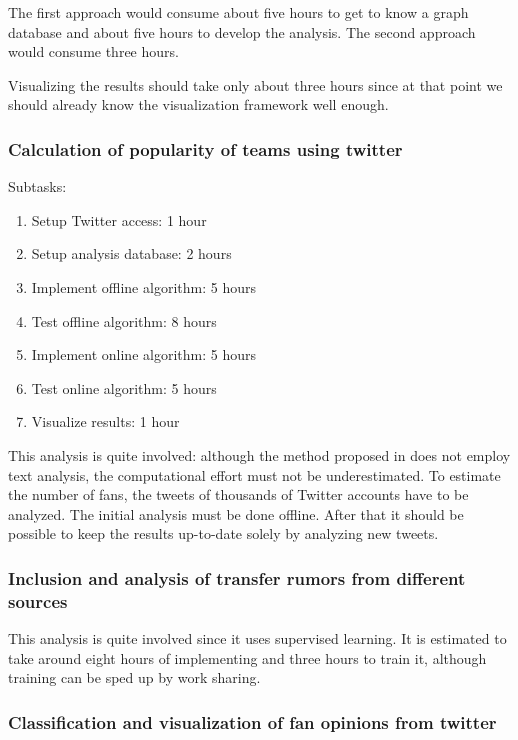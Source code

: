 \documentclass{article}
\begin{document}
The first approach would consume about five hours to get to know a graph database and about five hours to develop the analysis. The second approach would consume three hours.

Visualizing the results should take only about three hours since at that point we should already know the visualization framework well  enough.

\subsubsection{Calculation of popularity of teams using twitter}

Subtasks:
\begin{enumerate}
\item Setup Twitter access: 1 hour
\item Setup analysis database: 2 hours
\item Implement offline algorithm: 5 hours
\item Test offline algorithm: 8 hours
\item Implement online algorithm: 5 hours
\item Test online algorithm: 5 hours
\item Visualize results: 1 hour
\end{enumerate}

This analysis is quite involved: although the method proposed in \cite{Ramasamy:2013:IUI:2512938.2512960} does not employ text analysis, the computational effort must not be underestimated. To estimate the number of fans, the tweets of thousands of Twitter accounts have to be analyzed. The initial analysis must be done offline. After that it should be possible to keep the results up-to-date solely by analyzing new tweets.

\subsubsection{Inclusion and analysis of transfer rumors from different sources}

This analysis is quite involved since it uses supervised learning. It is estimated to take around eight hours of implementing and three hours to train it, although training can be sped up by work sharing.

\subsubsection{Classification and visualization of fan opinions from twitter}
\end{document}
